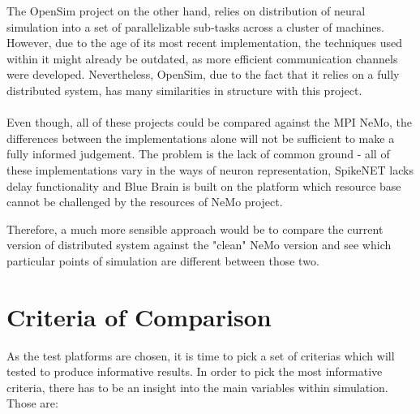 The OpenSim project on the other hand, relies on distribution of neural simulation into a set of parallelizable sub-tasks across a cluster of machines\cite{OpenSim}. However, due to the age of its most recent implementation, the techniques used within it might already be outdated, as more efficient communication channels were developed. Nevertheless, OpenSim, due to the fact that it relies on a fully distributed system, has many similarities in structure with this project. \\ \\


Even though, all of these projects could be compared against the MPI NeMo, the differences between the implementations alone will not be sufficient to make a fully informed judgement. The problem is the lack of common ground - all of these implementations vary in the ways of neuron representation, SpikeNET lacks delay functionality and Blue Brain is built on the platform which resource base cannot be challenged by the resources of NeMo project.

Therefore, a much more sensible approach would be to compare the current version of distributed system against the "clean" NeMo version and see which particular points of simulation are different between those two.

\clearpage

\section{Criteria of Comparison}

As the test platforms are chosen, it is time to pick a set of criterias which will tested to produce informative results. In order to pick the most informative criteria, there has to be an insight into the main variables within simulation. Those are:

